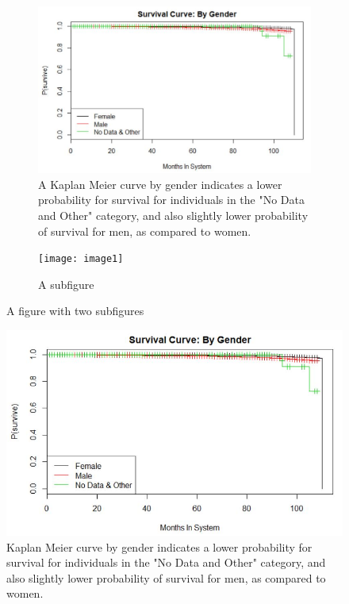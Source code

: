 \documentclass[twoside,10.5pt]{article}
\begin{document}
\begin{figure}
\centering
\begin{subfigure}{.5\textwidth}
  \centering
  \includegraphics[width=10cm\linewidth]{images/kaplan_meier_gender.JPG}
  \caption{A Kaplan Meier curve by gender indicates a lower probability for survival for individuals in the "No Data and Other" category, and also slightly lower probability of survival for men, as compared to women.}
  \label{fig:sub1}
\end{subfigure}%
\begin{subfigure}{.5\textwidth}
  \centering
  \texttt{[image: image1]}
  \caption{A subfigure}
  \label{fig:sub2}
\end{subfigure}
\caption{A figure with two subfigures}
\label{fig:test}
\end{figure}

\begin{figure}[htp]
\centering
\includegraphics[width=12cm]{images/kaplan_meier_gender.JPG}
\caption{Kaplan Meier curve by gender indicates a lower probability for survival for individuals in the "No Data and Other" category, and also slightly lower probability of survival for men, as compared to women.}
\label{fig:km_gender}
\end{figure}
\end{document}
